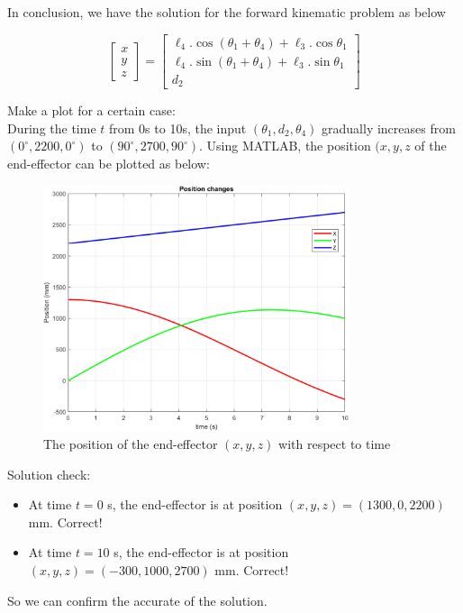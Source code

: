 In conclusion, we have the solution for the forward kinematic problem as below


\begin{equation}
    \begin{bmatrix}
        x  \\
        y \\
        z 
        \end{bmatrix}
    = 
    \begin{bmatrix}
        \ell_4.\cos(\theta_1 + \theta_4) + \ell_3.\cos\theta_1 \\
        \ell_4.\sin(\theta_1 + \theta_4) + \ell_3.\sin\theta_1 \\
        d_2 
        \end{bmatrix}
\end{equation}

Make a plot for a certain case: \\
\hspace*{0.6cm} During the time \( t \) from 0s to 10s, the input \( (\theta_1, d_2, \theta_4) \) gradually increases from \( (0^\circ, 2200, 0^\circ) \) to \( (90^\circ, 2700, 90^\circ) \). Using MATLAB, the position \( (x, y, z \) of the end-effector can be plotted as below:
\begin{figure}[H]
    \centering
    \includegraphics[width=0.8\textwidth]{pictures/test_forward.png}
    \caption{The position of the end-effector $(x,y,z)$ with respect to time}
    \label{fig:forward_kinematic}
\end{figure}
Solution check:
\begin{itemize}
    \item At time \( t = 0 \) s, the end-effector is at position \( (x,y,z) = (1300,0,2200) \) mm. Correct!\\
    \item At time \( t = 10 \) s, the end-effector is at position \( (x,y,z) = (-300,1000,2700) \) mm. Correct!\\
\end{itemize}
So we can confirm the accurate of the solution.
